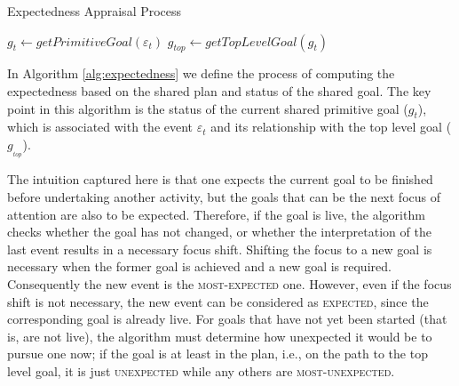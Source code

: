 \documentclass[12pt]{report}
\begin{document}
\begin{algorithm}
	\caption{Expectedness Appraisal Process}
	\label{alg:expectedness}
	\begin{algorithmic}[1]
			\Statex
			\State $\mathit{g}_{t} \gets \textit{getPrimitiveGoal}{(\varepsilon_t)}$
			\State $\mathit{g}_{top} \gets \textit{getTopLevelGoal}{(\mathit{g}_{t})}$
			\Statex
				\State {}
				\Else
					\State {}
				\EndIf
			\Else
					\State {}
				\Else
					\State {}
				\EndIf
			\EndIf
		\EndFunction
	\end{algorithmic}
\end{algorithm}

In Algorithm \ref{alg:expectedness} we define the process of computing the
expectedness based on the shared plan and status of the shared goal. The key
point in this algorithm is the status of the current shared primitive goal
($\mathit{g}_{t}$), which is associated with the event $\varepsilon_t$ and its
relationship with the top level goal ($\mathit{g}_{_{top}}$).

The intuition captured here is that one expects the current goal to be finished
before undertaking another activity, but the goals that can be the next focus of
attention are also to be expected. Therefore, if the goal is live, the algorithm
checks whether the goal has not changed, or whether the interpretation of the
last event results in a necessary focus shift. Shifting the focus to a new goal
is necessary when the former goal is achieved and a new goal is required.
Consequently the new event is the \textsc{most-expected} one. However, even if
the focus shift is not necessary, the new event can be considered as
\textsc{expected}, since the corresponding goal is already live. For goals that
have not yet been started (that is, are not live), the algorithm must determine
how unexpected it would be to pursue one now; if the goal is at least in the
plan, i.e., on the path to the top level goal, it is just \textsc{unexpected}
while any others are \textsc{most-unexpected}.
\end{document}
